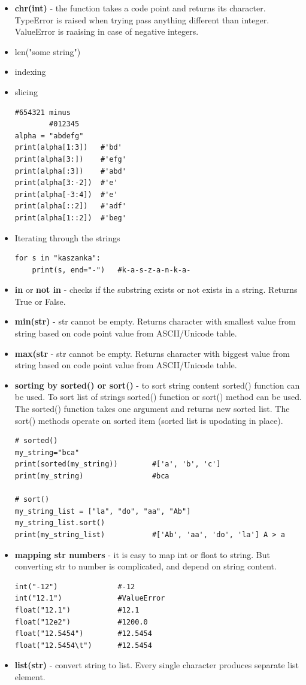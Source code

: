 \documentclass{article}
\begin{document}
\begin{itemize}
\item \textbf{chr(int)} - the function takes a code point and returns its character. \textcolor{pythonerror}{TypeError} is raised when trying pass anything different than integer. \textcolor{pythonerror}{ValueError} is raaising in case of negative integers.
\item len("some string")
\item indexing
\item slicing
\begin{lstlisting}[style=pystyle]
        #654321 minus
        #012345
alpha = "abdefg"
print(alpha[1:3])   #'bd'
print(alpha[3:])    #'efg'
print(alpha[:3])    #'abd'
print(alpha[3:-2])  #'e'
print(alpha[-3:4])  #'e'
print(alpha[::2])   #'adf'
print(alpha[1::2])  #'beg'
\end{lstlisting}
\item Iterating through the strings
\begin{lstlisting}[style=pystyle]
for s in "kaszanka":
    print(s, end="-")	#k-a-s-z-a-n-k-a-
\end{lstlisting}
\item \textbf{in} or \textbf{not in} - checks if the substring exists or not exists in a string. Returns True or False.
\item \textbf{min(str)} - str cannot be empty. Returns character with smallest value from string based on code point value from ASCII/Unicode table.
\item \textbf{max(str} - str cannot be empty. Returns character with biggest value from string based on code point value from ASCII/Unicode table.
\item \textbf{sorting by sorted() or sort()} - to sort string content sorted() function can be used. To sort list of strings sorted() function or sort() method can be used. The sorted() function takes one argument and returns new sorted list. The sort() methods operate on sorted item (sorted list is upodating in place).
\begin{lstlisting}[style=pystyle]
# sorted()
my_string="bca"
print(sorted(my_string))		#['a', 'b', 'c']
print(my_string)				#bca

# sort()
my_string_list = ["la", "do", "aa", "Ab"]
my_string_list.sort()
print(my_string_list)			#['Ab', 'aa', 'do', 'la'] A > a
\end{lstlisting}
\item \textbf{mapping str numbers} - it is easy to map int or float to string. But converting str to number is complicated, and depend on string content.
\begin{lstlisting}[style=pystyle]
int("-12")				#-12
int("12.1")				#ValueError
float("12.1")			#12.1
float("12e2")			#1200.0
float("12.5454")		#12.5454
float("12.5454\t")		#12.5454
\end{lstlisting}
\item \textbf{list(str)} - convert string to list. Every single character produces separate list element.
\end{itemize}
\end{document}
